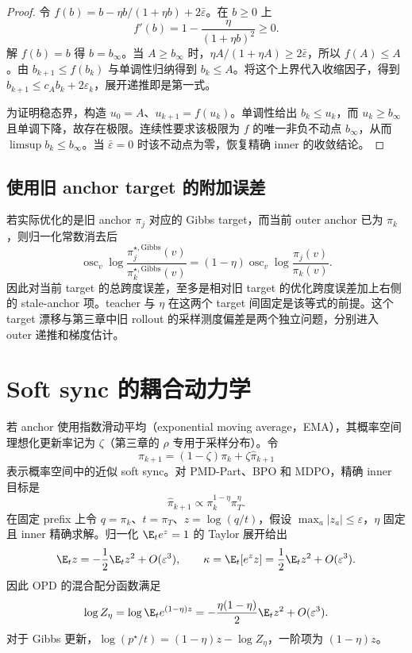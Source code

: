 \begin{proof}
令 $f(b)=b-\eta b/(1+\eta b)+2\bar\varepsilon$。在 $b\geq0$ 上
\[
 f'(b)=1-\frac{\eta}{(1+\eta b)^2}\geq0.
\]
解 $f(b)=b$ 得 $b=b_\infty$。当 $A\geq b_\infty$ 时，$\eta A/(1+\eta A)\geq2\bar\varepsilon$，所以 $f(A)\leq A$。由 $b_{k+1}\leq f(b_k)$ 与单调性归纳得到 $b_k\leq A$。将这个上界代入收缩因子，得到 $b_{k+1}\leq c_A b_k+2\varepsilon_k$，展开递推即是第一式。

为证明稳态界，构造 $u_0=A$、$u_{k+1}=f(u_k)$。单调性给出 $b_k\leq u_k$，而 $u_k\geq b_\infty$ 且单调下降，故存在极限。连续性要求该极限为 $f$ 的唯一非负不动点 $b_\infty$，从而 $\limsup b_k\leq b_\infty$。当 $\bar\varepsilon=0$ 时该不动点为零，恢复精确 inner 的收敛结论。
\end{proof}

\subsection{使用旧 anchor target 的附加误差}

若实际优化的是旧 anchor $\pi_j$ 对应的 Gibbs target，而当前 outer anchor 已为 $\pi_k$，则归一化常数消去后
\[
 \operatorname{osc}_v
 \log\frac{\pi_j^{\star,\mathrm{Gibbs}}(v)}
          {\pi_k^{\star,\mathrm{Gibbs}}(v)}
 =(1-\eta)\operatorname{osc}_v\log\frac{\pi_j(v)}{\pi_k(v)}.
\]
因此对当前 target 的总跨度误差，至多是相对旧 target 的优化跨度误差加上右侧的 stale-anchor 项。teacher 与 $\eta$ 在这两个 target 间固定是该等式的前提。这个 target 漂移与第三章中旧 rollout 的采样测度偏差是两个独立问题，分别进入 outer 递推和梯度估计。



\section{Soft sync 的耦合动力学}

若 anchor 使用指数滑动平均（exponential moving average，EMA），其概率空间理想化更新率记为 $\zeta$（第三章的 $\rho$ 专用于采样分布）。令
\[
 \pi_{k+1}=(1-\zeta)\pi_k+\zeta\widehat\pi_{k+1}
\]
表示概率空间中的近似 soft sync。对 PMD-Part、BPO 和 MDPO，精确 inner 目标是
\[
 \widehat\pi_{k+1}\propto\pi_k^{1-\eta}\pi_T^\eta.
\]
在固定 prefix 上令 $q=\pi_k$、$t=\pi_T$、$z=\log(q/t)$，假设 $\max_a|z_a|\le\varepsilon$，$\eta$ 固定且 inner 精确求解。归一化 $\E_te^z=1$ 的 Taylor 展开给出
\[
\E_tz=-\frac12\E_tz^2+O(\varepsilon^3),\qquad
\kappa=\E_t[e^zz]=\frac12\E_tz^2+O(\varepsilon^3).
\]
因此 OPD 的混合配分函数满足
\[
\log Z_\eta=\log\E_te^{(1-\eta)z}
=-\frac{\eta(1-\eta)}2\E_tz^2+O(\varepsilon^3).
\]
对于 Gibbs 更新，$\log(p^\star/t)=(1-\eta)z-\log Z_\eta$，一阶项为 $(1-\eta)z$。


